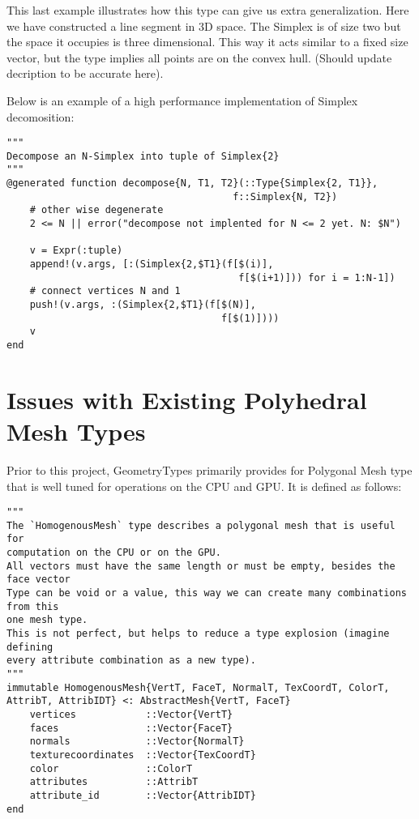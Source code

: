 This last example illustrates how this type can give us extra generalization.
Here we have constructed a line segment in 3D space. The Simplex is of
size two but the space it occupies is three dimensional. This way it acts
similar to a fixed size vector, but the type implies all points are on the
convex hull. (Should update decription to be accurate here).

Below is an example of a high performance implementation of Simplex decomosition:

\begin{lstlisting}
"""
Decompose an N-Simplex into tuple of Simplex{2}
"""
@generated function decompose{N, T1, T2}(::Type{Simplex{2, T1}},
                                       f::Simplex{N, T2})
    # other wise degenerate
    2 <= N || error("decompose not implented for N <= 2 yet. N: $N")

    v = Expr(:tuple)
    append!(v.args, [:(Simplex{2,$T1}(f[$(i)],
                                        f[$(i+1)])) for i = 1:N-1])
    # connect vertices N and 1
    push!(v.args, :(Simplex{2,$T1}(f[$(N)],
                                     f[$(1)])))
    v
end
\end{lstlisting}

\section{Issues with Existing Polyhedral Mesh Types}

Prior to this project, GeometryTypes primarily provides for Polygonal Mesh
type that is well tuned for operations on the CPU and GPU. It is defined
as follows:

\begin{lstlisting}
"""
The `HomogenousMesh` type describes a polygonal mesh that is useful for
computation on the CPU or on the GPU.
All vectors must have the same length or must be empty, besides the face vector
Type can be void or a value, this way we can create many combinations from this
one mesh type.
This is not perfect, but helps to reduce a type explosion (imagine defining
every attribute combination as a new type).
"""
immutable HomogenousMesh{VertT, FaceT, NormalT, TexCoordT, ColorT, AttribT, AttribIDT} <: AbstractMesh{VertT, FaceT}
    vertices            ::Vector{VertT}
    faces               ::Vector{FaceT}
    normals             ::Vector{NormalT}
    texturecoordinates  ::Vector{TexCoordT}
    color               ::ColorT
    attributes          ::AttribT
    attribute_id        ::Vector{AttribIDT}
end
\end{lstlisting}

